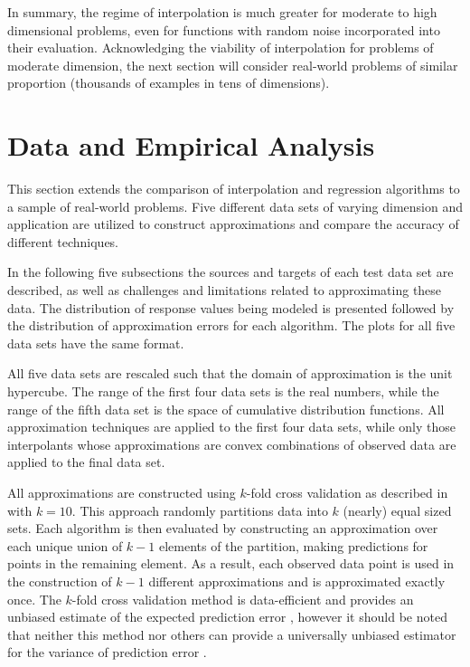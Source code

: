 \documentclass[smallextended,final]{svjour3}  %
\begin{document}
In summary, the regime of interpolation is much greater for moderate
to high dimensional problems, even for functions with random noise
incorporated into their evaluation. Acknowledging the viability of
interpolation for problems of moderate dimension, the next section
will consider real-world problems of similar proportion (thousands of
examples in tens of dimensions).


\vspace{-2mm}
\section{Data and Empirical Analysis}
\label{sec:data}

This section extends the comparison of interpolation and regression
algorithms to a sample of real-world problems. Five different data
sets of varying dimension and application are utilized to construct
approximations and compare the accuracy of different techniques.

In the following five subsections the sources and targets of each test
data set are described, as well as challenges and limitations related
to approximating these data. The distribution of response values being
modeled is presented followed by the distribution of approximation
errors for each algorithm. The plots for all five data sets have the
same format.

All five data sets are rescaled such that the domain of approximation
is the unit hypercube. The range of the first four data sets is the
real numbers, while the range of the fifth data set is the space of
cumulative distribution functions. All approximation techniques are
applied to the first four data sets, while only those interpolants
whose approximations are convex combinations of observed data are
applied to the final data set.

All approximations are constructed using $k$-fold cross validation as
described in \cite{kohavi1995study} with $k=10$. This approach
randomly partitions data into $k$ (nearly) equal sized sets. Each
algorithm is then evaluated by constructing an approximation over each
unique union of $k-1$ elements of the partition, making predictions
for points in the remaining element. As a result, each observed data
point is used in the construction of $k-1$ different approximations
and is approximated exactly once. The $k$-fold cross validation method
is data-efficient and provides an unbiased estimate of the expected
prediction error \cite{kohavi1995study}, however it should be noted
that neither this method nor others can provide a universally unbiased
estimator for the variance of prediction error \cite{bengio2004no}.
\end{document}
